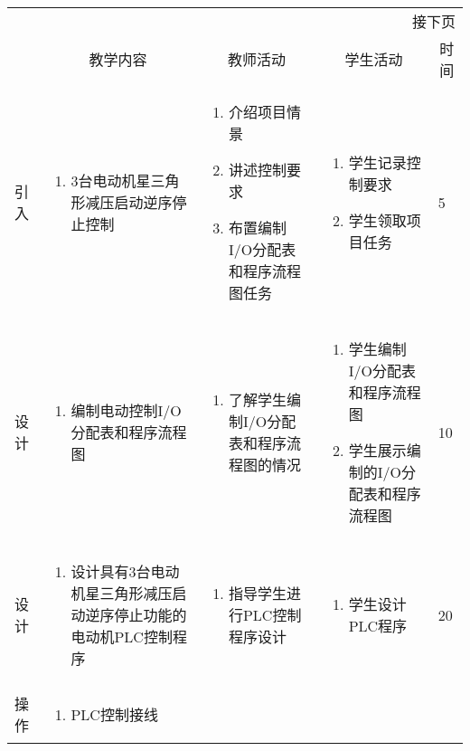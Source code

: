 {\begin{landscape}
\begin{longtable}{|m{10mm}|m{50mm}|m{50mm}|m{50mm}|m{15mm}|}
\multicolumn{5}{r}{\small 接下页}\\
\endfoot
\hline
\endlastfoot
\multicolumn{1}{|c|}{步骤}&\multicolumn{1}{c|}{教学内容}&\multicolumn{1}{c|}{教师活动}&\multicolumn{1}{c|}{学生活动}&\multicolumn{1}{c|}{时间}\\\hline
引入&\begin{enumerate}
\item 3台电动机星三角形减压启动逆序停止控制
\end{enumerate} &\begin{enumerate}
\item 介绍项目情景
\item 讲述控制要求
\item 布置编制I/O分配表和程序流程图任务
\end{enumerate} &\begin{enumerate}
\item 学生记录控制要求
\item 学生领取项目任务
\end{enumerate} &5 \\\hline
设计&
\begin{enumerate}
\item 编制电动控制I/O分配表和程序流程图
\end{enumerate} &\begin{enumerate}
\item 了解学生编制I/O分配表和程序流程图的情况
\end{enumerate} &\begin{enumerate}
\item 学生编制I/O分配表和程序流程图
\item 学生展示编制的I/O分配表和程序流程图
\end{enumerate} &10 \\\hline
设计&\begin{enumerate}
\item 设计具有3台电动机星三角形减压启动逆序停止功能的电动机PLC控制程序
\end{enumerate}
&\begin{enumerate}
\item 指导学生进行PLC控制程序设计
\end{enumerate} &\begin{enumerate}
\item 学生设计PLC程序
\end{enumerate} &20 \\\hline
操作&
\begin{enumerate}
\item PLC控制接线

\end{enumerate}
\end{longtable}
\end{landscape}}

